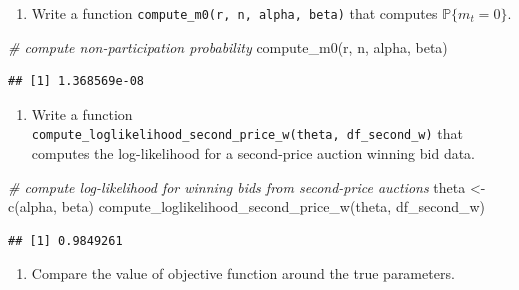 \documentclass[
]{book}
\newenvironment{Shaded}{\begin{snugshade}}{\end{snugshade}}
\newcommand{\CommentTok}[1]{\textcolor[rgb]{0.56,0.35,0.01}{\textit{#1}}}
\newcommand{\FunctionTok}[1]{\textcolor[rgb]{0.00,0.00,0.00}{#1}}
\newcommand{\NormalTok}[1]{#1}
\newcommand{\OtherTok}[1]{\textcolor[rgb]{0.56,0.35,0.01}{#1}}
\providecommand{\tightlist}{%
  \setlength{\itemsep}{0pt}\setlength{\parskip}{0pt}}
\begin{document}
\begin{enumerate}
\def\labelenumi{\arabic{enumi}.}
\setcounter{enumi}{1}
\tightlist
\item
  Write a function \texttt{compute\_m0(r,\ n,\ alpha,\ beta)} that computes \(\mathbb{P}\{m_t = 0\}\).
\end{enumerate}

\begin{Shaded}
\begin{Highlighting}[]
\CommentTok{\# compute non{-}participation probability}
\FunctionTok{compute\_m0}\NormalTok{(r, n, alpha, beta)}
\end{Highlighting}
\end{Shaded}

\begin{verbatim}
## [1] 1.368569e-08
\end{verbatim}

\begin{enumerate}
\def\labelenumi{\arabic{enumi}.}
\setcounter{enumi}{1}
\tightlist
\item
  Write a function \texttt{compute\_loglikelihood\_second\_price\_w(theta,\ df\_second\_w)} that computes the log-likelihood for a second-price auction winning bid data.
\end{enumerate}

\begin{Shaded}
\begin{Highlighting}[]
\CommentTok{\# compute log{-}likelihood for winning bids from second{-}price auctions}
\NormalTok{theta }\OtherTok{\textless{}{-}} \FunctionTok{c}\NormalTok{(alpha, beta)}
\FunctionTok{compute\_loglikelihood\_second\_price\_w}\NormalTok{(theta, df\_second\_w)}
\end{Highlighting}
\end{Shaded}

\begin{verbatim}
## [1] 0.9849261
\end{verbatim}

\begin{enumerate}
\def\labelenumi{\arabic{enumi}.}
\setcounter{enumi}{2}
\tightlist
\item
  Compare the value of objective function around the true parameters.
\end{enumerate}
\end{document}

